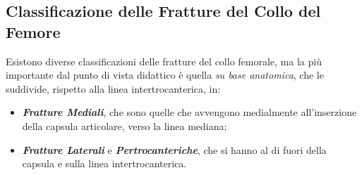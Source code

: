 \subsection{Classificazione delle Fratture del Collo del Femore}


Esistono diverse classificazioni delle fratture del collo femorale, ma
la più importante dal punto di vista didattico è quella \emph{su base
anatomica}, che le suddivide, rispetto alla linea intertrocanterica, in:

\begin{itemize}
\item
  \textbf{\emph{Fratture Mediali}}, che sono quelle che avvengono
  medialmente all'inserzione della capsula articolare, verso la linea
  mediana;
\item
  \textbf{\emph{Fratture Laterali}} e \textbf{\emph{Pertrocanteriche}},
  che si hanno al di fuori della capsula e sulla linea
  intertrocanterica.
\end{itemize}

